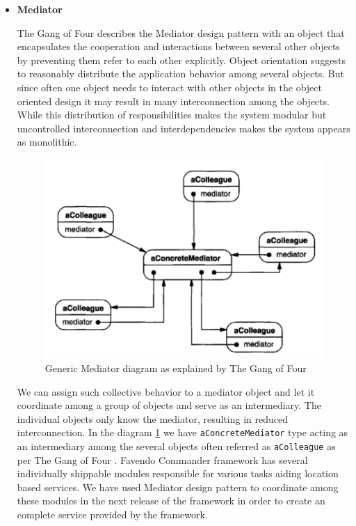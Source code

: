 \begin{itemize}
	\item \textbf{Mediator}
	\par The Gang of Four \cite{gamma1995design} describes the Mediator design pattern with an object that encapsulates the cooperation and interactions between several other objects by preventing them refer to each other explicitly. Object orientation suggests to reasonably distribute the application behavior among several objects. But since often one object needs to interact with other objects in the object oriented design it may result in many interconnection among the objects. While this distribution of responsibilities makes the system modular but uncontrolled interconnection and interdependencies makes the system appears as monolithic.
	\begin{figure}[H]
		\centering
		\includegraphics[scale = 0.4]{images/mediator}
		\caption{Generic Mediator diagram as explained by The Gang of Four  \cite{gamma1995design}}
		\label{figure:design_pattern_mediator}
	\end{figure}
	\par We can assign such collective behavior to a mediator object and let it coordinate among a group of objects and serve as an intermediary. The individual objects only know the mediator, resulting in reduced interconnection. In the diagram \ref{figure:design_pattern_mediator} we have  \texttt{aConcreteMediator} type acting as an intermediary among the several objects often referred as \texttt{aColleague} as per The Gang of Four \cite{gamma1995design}. Favendo Commander framework has several individually shippable modules responsible for various tasks aiding location based services. We have used Mediator design pattern to coordinate among these modules in the next release of the framework in order to create an complete service provided by the framework.

\end{itemize}
